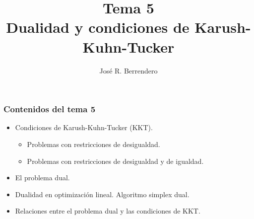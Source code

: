 \documentclass{beamer}
\title[Estad\'{\i}stica: Tema 5]{Tema 5\\
Dualidad y condiciones de Karush-Kuhn-Tucker}
\author[Berrendero]
{Jos\'{e} R. Berrendero}
\date{}
\institute{Departamento de Matem\'{a}ticas\\
 Universidad Aut\'{o}noma de Madrid}
\begin{document}



\frame{\titlepage}
\begin{frame}[plain]
\frametitle{Contenidos del tema 5}

\begin{itemize}
 
\item Condiciones de Karush-Kuhn-Tucker (KKT).
\begin{itemize}
\item Problemas con restricciones de desigualdad.
\item Problemas con restricciones de desigualdad y de igualdad.
\end{itemize}
	
  \item El problema dual.
  
  \item Dualidad en optimización lineal. Algoritmo simplex dual.

 \item Relaciones entre el problema dual y las condiciones de KKT.
\end{itemize}


\end{frame}
\end{document}
